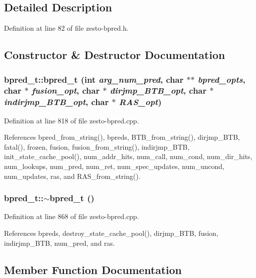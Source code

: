 \subsection{Detailed Description}


Definition at line 82 of file zesto-bpred.h.

\subsection{Constructor \& Destructor Documentation}
\subsubsection[{bpred\_\-t}]{\setlength{\rightskip}{0pt plus 5cm}bpred\_\-t::bpred\_\-t (int {\em arg\_\-num\_\-pred}, \/  char $\ast$$\ast$ {\em bpred\_\-opts}, \/  char $\ast$ {\em fusion\_\-opt}, \/  char $\ast$ {\em dirjmp\_\-BTB\_\-opt}, \/  char $\ast$ {\em indirjmp\_\-BTB\_\-opt}, \/  char $\ast$ {\em RAS\_\-opt})}\label{classbpred__t_079b520ec2ae62a561ede3cb4d4994b1}




Definition at line 818 of file zesto-bpred.cpp.

References bpred\_\-from\_\-string(), bpreds, BTB\_\-from\_\-string(), dirjmp\_\-BTB, fatal(), frozen, fusion, fusion\_\-from\_\-string(), indirjmp\_\-BTB, init\_\-state\_\-cache\_\-pool(), num\_\-addr\_\-hits, num\_\-call, num\_\-cond, num\_\-dir\_\-hits, num\_\-lookups, num\_\-pred, num\_\-ret, num\_\-spec\_\-updates, num\_\-uncond, num\_\-updates, ras, and RAS\_\-from\_\-string().
\subsubsection[{$\sim$bpred\_\-t}]{\setlength{\rightskip}{0pt plus 5cm}bpred\_\-t::$\sim$bpred\_\-t ()}\label{classbpred__t_835d572c43d6dbfcdc2076e2518f42c6}




Definition at line 868 of file zesto-bpred.cpp.

References bpreds, destroy\_\-state\_\-cache\_\-pool(), dirjmp\_\-BTB, fusion, indirjmp\_\-BTB, num\_\-pred, and ras.

\subsection{Member Function Documentation}
